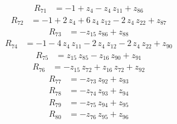 \begin{equation*}\begin{aligned}
R_{71}&=-1 +z_{4} -z_{4}\,z_{11} +z_{86}
\end{aligned}\end{equation*}
\begin{equation*}\begin{aligned}
R_{72}&=-1 +2\,z_{4} +6\,z_{4}\,z_{12} -2\,z_{4}\,z_{22} +z_{87}
\end{aligned}\end{equation*}
\begin{equation*}\begin{aligned}
R_{73}&=-z_{15}\,z_{86} +z_{88}
\end{aligned}\end{equation*}
\begin{equation*}\begin{aligned}
R_{74}&=-1 -4\,z_{4}\,z_{11} -2\,z_{4}\,z_{12} -2\,z_{4}\,z_{22} +z_{90}
\end{aligned}\end{equation*}
\begin{equation*}\begin{aligned}
R_{75}&=z_{15}\,z_{85} -z_{16}\,z_{90} +z_{91}
\end{aligned}\end{equation*}
\begin{equation*}\begin{aligned}
R_{76}&=-z_{15}\,z_{72} +z_{16}\,z_{72} +z_{92}
\end{aligned}\end{equation*}
\begin{equation*}\begin{aligned}
R_{77}&=-z_{73}\,z_{92} +z_{93}
\end{aligned}\end{equation*}
\begin{equation*}\begin{aligned}
R_{78}&=-z_{74}\,z_{93} +z_{94}
\end{aligned}\end{equation*}
\begin{equation*}\begin{aligned}
R_{79}&=-z_{75}\,z_{94} +z_{95}
\end{aligned}\end{equation*}
\begin{equation*}\begin{aligned}
R_{80}&=-z_{76}\,z_{95} +z_{96}
\end{aligned}\end{equation*}

